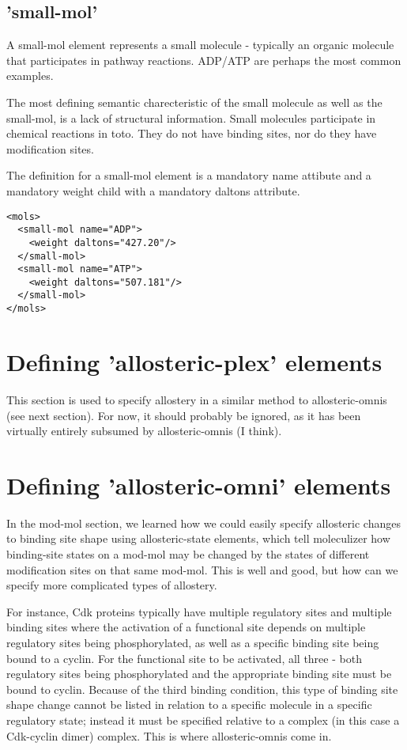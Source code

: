 \subsection{'small-mol'}
A small-mol element represents a small molecule - typically an organic
molecule that participates in pathway reactions.  ADP/ATP are perhaps
the most common examples.

The most defining semantic charecteristic of the small molecule as
well as the small-mol, is a lack of structural information.  Small 
molecules participate in chemical reactions in toto.  They do not have
binding sites, nor do they have modification sites. 

The definition for a small-mol element is a mandatory name attibute
and a mandatory weight child with a mandatory daltons attribute.

\lstset{language=XML}
\begin{lstlisting}[caption=Examples of small-mol definitions, label=smallmolex]
<mols>
  <small-mol name="ADP">
    <weight daltons="427.20"/>
  </small-mol>
  <small-mol name="ATP">
    <weight daltons="507.181"/>
  </small-mol>
</mols>
\end{lstlisting}

\section{Defining 'allosteric-plex' elements}

This section is used to specify allostery in a similar method to
allosteric-omnis (see next section).  For now, it should probably be
ignored, as it has been virtually entirely subsumed by
allosteric-omnis (I think).  

\section{Defining 'allosteric-omni' elements}

In the mod-mol section, we learned how we could easily specify
allosteric changes to binding site shape using allosteric-state
elements, which tell moleculizer how binding-site states on a mod-mol
may be changed by the states of different modification sites on that
same mod-mol.  This is well and good, but how can we specify more
complicated types of allostery.

For instance, Cdk proteins typically have multiple regulatory sites
and multiple binding sites where the activation of a functional site
depends on multiple regulatory sites being phosphorylated, as well as
a specific binding site being bound to a cyclin.  For the functional
site to be activated, all three - both regulatory sites being
phosphorylated and the appropriate binding site must be bound to
cyclin.  Because of the third binding condition, this type of binding
site shape change cannot be listed in relation to a specific molecule
in a specific regulatory state; instead it must be specified relative
to a complex (in this case a Cdk-cyclin dimer) complex.  This is where
allosteric-omnis come in.

